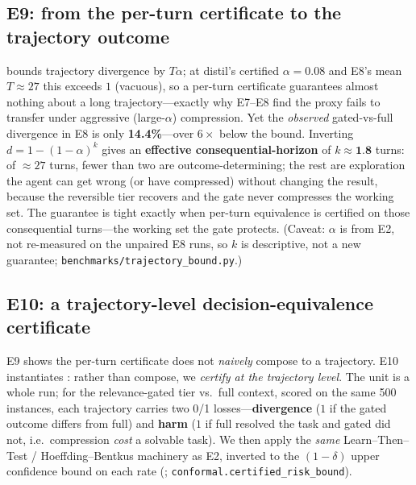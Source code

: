 \documentclass{article}
\newcommand{\sweEeightN}{500}\newcommand{\sweEeightSeed}{1729}%
\begin{document}
\subsection{E9: from the per-turn certificate to the trajectory outcome}
\label{sec:e9}

 bounds trajectory divergence by $T\alpha$; at distil's certified
$\alpha=0.08$ and E8's mean $T\approx27$ this exceeds $1$ (vacuous), so a per-turn certificate
guarantees almost nothing about a long trajectory---exactly why E7--E8 find the proxy fails to
transfer under aggressive (large-$\alpha$) compression. Yet the \emph{observed} gated-vs-full
divergence in E8 is only \textbf{14.4\%}---over $6\times$ below the bound. Inverting
$d=1-(1-\alpha)^{k}$ gives an \textbf{effective consequential-horizon} of
$k\approx\textbf{1.8}$ turns: of $\approx27$ turns, fewer than two are outcome-determining;
the rest are exploration the agent can get wrong (or have compressed) without changing the
result, because the reversible tier recovers and the gate never compresses the working set.
The guarantee is tight exactly when per-turn equivalence is certified on those consequential
turns---the working set the gate protects. (Caveat: $\alpha$ is from E2, not re-measured on
the unpaired E8 runs, so $k$ is descriptive, not a new guarantee;
\texttt{benchmarks/trajectory\_bound.py}.)

\subsection{E10: a trajectory-level decision-equivalence certificate}
\label{sec:e10}

E9 shows the per-turn certificate does not \emph{naively} compose to a trajectory. E10
instantiates : rather than compose, we \emph{certify at the trajectory level}.
The unit is a whole run; for the relevance-gated tier vs.\ full context, scored on the same
\sweEeightN{} instances, each trajectory carries two 0/1 losses---\textbf{divergence}
($1$ if the gated outcome differs from full) and \textbf{harm} ($1$ if full resolved the
task and gated did not, i.e.\ compression \emph{cost} a solvable task). We then apply the
\emph{same} Learn--Then--Test / Hoeffding--Bentkus machinery as E2, inverted to the
$(1-\delta)$ upper confidence bound on each rate (;
\texttt{conformal.certified\_risk\_bound}).
\end{document}
